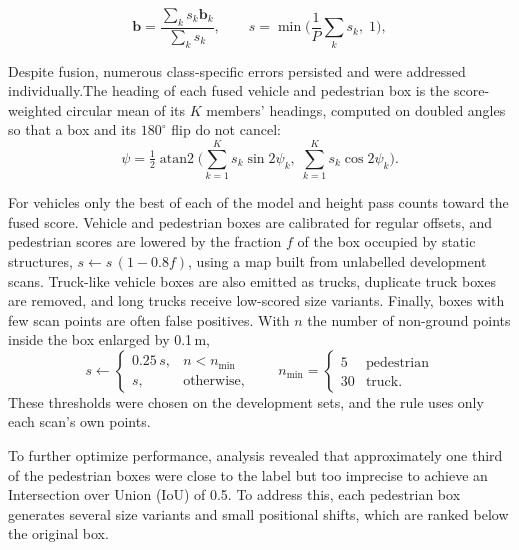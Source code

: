 \documentclass[conference]{IEEEtran}
\begin{document}
\begin{equation}
\mathbf{b} = \frac{\sum_{k} s_k \mathbf{b}_k}{\sum_{k} s_k}, \qquad s = \min\!\Big(\frac{1}{P}\sum_{k} s_k,\; 1\Big),
\end{equation}

Despite fusion, numerous class-specific errors persisted and were addressed individually.The heading of each fused vehicle and pedestrian box is the score-weighted circular mean of its $K$ members' headings, computed on doubled angles so that a box and its $180^\circ$ flip do not cancel:
\begin{equation}
\psi = \tfrac{1}{2}\operatorname{atan2}\!\Big(\sum_{k=1}^{K} s_k \sin 2\psi_k,\; \sum_{k=1}^{K} s_k \cos 2\psi_k\Big).
\end{equation}


For vehicles only the best of each of the model and height pass counts toward the fused score. Vehicle and pedestrian boxes are calibrated for regular offsets, and pedestrian scores are lowered by the fraction $f$ of the box occupied by static structures, $s \leftarrow s\,(1-0.8f)$, using a map built from unlabelled development scans.  Truck-like vehicle boxes are also emitted as trucks, duplicate truck boxes are removed, and long trucks receive low-scored size variants. Finally, boxes with few scan points are often false positives. With $n$ the number of non-ground points inside the box enlarged by 0.1\,m,\begin{equation}
s \leftarrow
\begin{cases}
0.25\,s, & n < n_{\min}\\
s, & \text{otherwise,}
\end{cases}
\qquad n_{\min} = \begin{cases} 5 & \text{pedestrian}\\ 30 & \text{truck.}\end{cases}
\end{equation}
These thresholds were chosen on the development sets, and the rule uses only each scan's own points.



To further optimize performance, analysis revealed that approximately one third of the pedestrian boxes were close to the label but too imprecise to achieve an Intersection over Union (IoU) of 0.5. To address this, each pedestrian box generates several size variants and small positional shifts, which are ranked below the original box.

\end{document}
